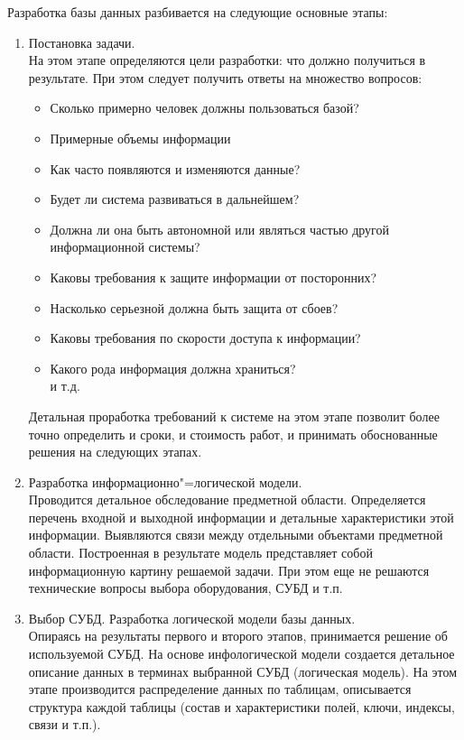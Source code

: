 \begin{flushleft}
    Разработка базы данных разбивается на следующие основные этапы:\\
    \begin{enumerate}
        \item Постановка задачи. \\
        На этом этапе определяются цели разработки: что должно получиться 
        в результате. При этом следует получить ответы на множество вопросов:
        \begin{itemize}
            \item Сколько примерно человек должны пользоваться базой?
            \item Примерные объемы информации
            \item Как часто появляются и изменяются данные?
            \item Будет ли система развиваться в дальнейшем?
            \item Должна ли она быть автономной или являться частью другой информационной системы?
            \item Каковы требования к защите информации от посторонних?
            \item Насколько серьезной должна быть защита от сбоев?
            \item Каковы требования по скорости доступа к информации?
            \item Какого рода информация должна храниться?\\
            и т.д.
        \end{itemize}
        Детальная проработка требований к системе на этом этапе позволит более точно определить 
        и сроки, и стоимость работ, и принимать обоснованные решения на следующих этапах.
        \item Разработка информационно"=логической модели. \\
        Проводится детальное обследование предметной области. Определяется 
        перечень входной и выходной информации и детальные характеристики 
        этой информации. Выявляются связи между отдельными объектами предметной 
        области. Построенная в результате модель представляет собой информационную
        картину решаемой задачи. При этом еще не решаются технические вопросы 
        выбора оборудования, СУБД и т.п.
        
        \item Выбор СУБД. Разработка логической модели базы данных. \\
        Опираясь на результаты первого и второго этапов, принимается решение об
        используемой СУБД. На основе инфологической модели создается детальное 
        описание данных в терминах выбранной СУБД (логическая модель). На этом 
        этапе производится распределение данных по таблицам, описывается структура
        каждой таблицы (состав и характеристики полей, ключи, индексы, связи и т.п.).\\


\end{enumerate}
\end{flushleft}

